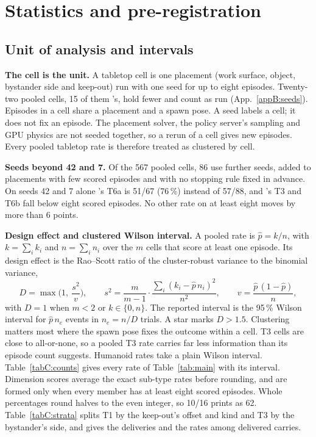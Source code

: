 \providecommand{\tW}{\blacktriangle}
\providecommand{\tJ}{\blacklozenge}
\providecommand{\tU}{{\scriptscriptstyle\bigcirc}}

\section{Statistics and pre-registration}
\label{app:stats}

\subsection{Unit of analysis and intervals}
\label{app:c-unit}

\textbf{The cell is the unit.} A tabletop cell is one placement (work surface, object, bystander side and keep-out) run
with one seed for up to eight episodes. Twenty-two pooled cells, 15 of them \grd{}'s, hold fewer and count
as run (App.~\ref{appB:seeds}). Episodes in a cell share a placement and a spawn pose. A seed labels a cell; it does not
fix an episode. The placement solver, the policy server's sampling and GPU physics are not seeded together, so a rerun of
a cell gives new episodes. Every pooled tabletop rate is therefore treated as clustered by cell.

\textbf{Seeds beyond 42 and 7.} Of the 567 pooled cells, 86 use further seeds, added to placements with few scored
episodes and with no stopping rule fixed in advance. On seeds 42 and 7 alone \pifive{}'s T6a is 51/67 (76\,\%) instead
of 57/88, and \pizero{}'s T3 and T6b fall below eight scored episodes. No other rate on at least eight moves by more
than 6 points.

\textbf{Design effect and clustered Wilson interval.} A pooled rate is $\hat p = k/n$, with $k=\sum_i k_i$ and
$n=\sum_i n_i$ over the $m$ cells that score at least one episode. Its design effect is the Rao--Scott ratio of the
cluster-robust variance to the binomial variance,
\begin{equation*}
D=\max\Big(1,\ \frac{s^2}{v}\Big),\qquad
s^2=\frac{m}{m-1}\cdot\frac{\sum_i (k_i-\hat p\,n_i)^2}{n^2},\qquad
v=\frac{\hat p\,(1-\hat p)}{n},
\end{equation*}
with $D=1$ when $m<2$ or $k\in\{0,n\}$. The reported interval is the 95\,\% Wilson interval for $\hat p\,n_e$ events in
$n_e=n/D$ trials. A star marks $D>1.5$. Clustering matters most where the spawn pose fixes the outcome within a cell.
T3 cells are close to all-or-none, so a pooled T3 rate carries far less information than its episode count suggests.
Humanoid rates take a plain Wilson interval. Table~\ref{tabC:counts} gives every rate of Table~\ref{tab:main} with its
interval. Dimension scores average the exact sub-type rates before rounding, and are formed only when every member has
at least eight scored episodes. Whole percentages round halves to the even integer, so 10/16 prints as 62.
Table~\ref{tabC:strata} splits T1 by the keep-out's offset and kind and T3 by the
bystander's side, and gives the deliveries and the rates among delivered carries.

